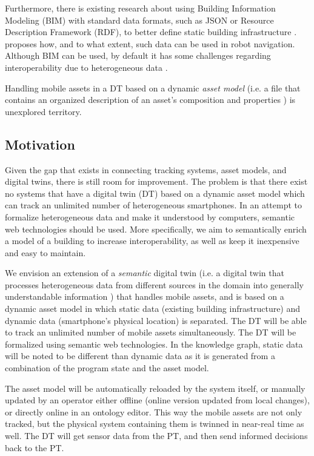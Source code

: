 \documentclass{article}
\begin{document}
Furthermore, there is existing research about using Building Information Modeling (BIM) with standard data formats, such as JSON or Resource Description Framework (RDF), to better define static building infrastructure \cite{pauwels_live_2023}. \citeauthor{pauwels_live_2023} proposes how, and to what extent, such data can be used in robot navigation. Although BIM can be used, by default it has some challenges regarding interoperability due to heterogeneous data \cite{dinis_bim_2022,godager_concept_2021}.

Handling mobile assets in a DT based on a dynamic \emph{asset model} (i.e. a file that contains an organized description of an asset's composition and properties \cite{kamburjan_twinning-by-construction_2022}) is unexplored territory.

\subsection{Motivation}\label{subsec:Motivation}
Given the gap that exists in connecting tracking systems, asset models, and digital twins, there is still room for improvement. The problem is that there exist no systems that have a digital twin (DT) based on a dynamic asset model which can track an unlimited number of heterogeneous smartphones. In an attempt to formalize heterogeneous data and make it understood by computers, semantic web technologies should be used. More specifically, we aim to semantically enrich a model of a building to increase interoperability, as well as keep it inexpensive and easy to maintain.

We envision an extension of a \emph{semantic} digital twin (i.e. a digital twin that processes heterogeneous data from different sources in the domain into generally understandable information \cite{birgit_boss_digital_nodate}) that handles mobile assets, and is based on a dynamic asset model in which static data (existing building infrastructure) and dynamic data (smartphone's physical location) is separated. The DT will be able to track an unlimited number of mobile assets simultaneously. The DT will be formalized using semantic web technologies. In the knowledge graph, static data will be noted to be different than dynamic data as it is generated from a combination of the program state and the asset model. 

The asset model will be automatically reloaded by the system itself, or manually updated by an operator either offline (online version updated from local changes), or directly online in an ontology editor. This way the mobile assets are not only tracked, but the physical system containing them is twinned in near-real time as well. The DT will get sensor data from the PT, and then send informed decisions back to the PT.
\end{document}
